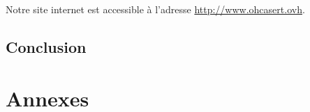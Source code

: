 \documentclass[11pt]{report}
\begin{document}
Notre site internet est accessible à l'adresse \url{http://www.ohcasert.ovh}.

\chapter{Conclusion}



%
%

\newpage
{}
\part*{Annexes}

\newpage
\listoffigures
 
\end{document}

